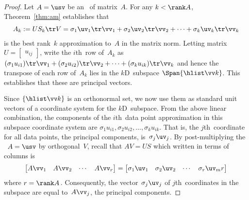 \begin{proof} 
Let \(A=\usv\) be an \svd\ of matrix~\(A\).
For any \(k<\rank A\), Theorem~\ref{thm:am} establishes that 
\begin{equation*}
A_k:=US_k\tr V 
=\sigma_1\uv_1\tr\vv_1 +\sigma_2\uv_2\tr\vv_2+\cdots +\sigma_k\uv_k\tr\vv_k
\end{equation*}
is the best rank~\(k\) approximation to~\(A\) in the matrix norm.
Letting matrix \(U=\begin{bmatrix} u_{ij} \end{bmatrix}\), write the \(i\)th~row of~\(A_k\) as
\((\sigma_1u_{i1})\tr\vv_1 +(\sigma_2u_{i2})\tr\vv_2+\cdots +(\sigma_ku_{ik})\tr\vv_k\) and hence the transpose of each row of~\(A_k\) lies in the \(k\)D~subspace \(\Span\{\hlist\vv k\}\).
This establishes that these are principal vectors.

Since \(\{\hlist\vv k\}\) is an orthonormal set, we now use them as standard unit vectors of a coordinate system for the \(k\)D~subspace.
From the above linear combination, the components of the \(i\)th~data point approximation in this subspace coordinate system are \(\sigma_1u_{i1},\sigma_2u_{i2},\ldots,\sigma_ku_{ik}\).
That is, the \(j\)th~coordinate for all data points, the principal components, is~\(\sigma_j\uv_j\).
By post-multiplying the \svd\ \(A=\usv\) by orthogonal~\(V\), recall that \(AV=US\) which written in terms of columns is
\begin{equation*}
\begin{bmatrix} A\vv_1&A\vv_2&\cdots&A\vv_r \end{bmatrix}
=\begin{bmatrix} \sigma_1\uv_1&\sigma_2\uv_2&\cdots&\sigma_r\uv_mr\end{bmatrix}
\end{equation*}
where \(r=\rank A\)\,.  
Consequently, the vector~\(\sigma_j\uv_j\) of \(j\)th~coordinates in the subspace are equal to~\(A\vv_j\), the principal components.
\end{proof}






